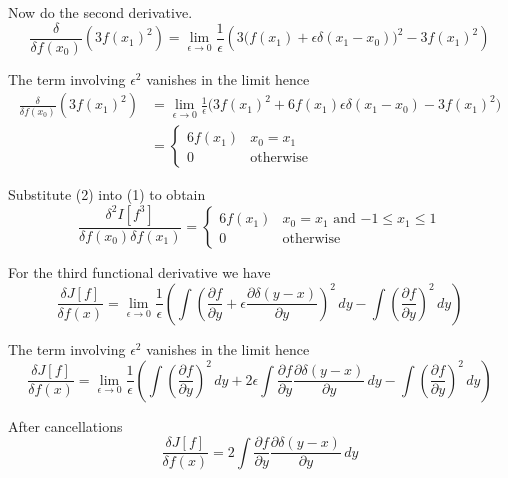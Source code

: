 Now do the second derivative.
\begin{equation*}
\frac{\delta}{\delta f(x_0)}\left(3f(x_1)^2\right)
=\lim_{\epsilon\rightarrow0}\frac{1}{\epsilon}
\left(
3\big(f(x_1)+\epsilon\delta(x_1-x_0)\big)^2-3f(x_1)^2
\right)
\end{equation*}

The term involving $\epsilon^2$ vanishes in the limit hence
\begin{align*}
\frac{\delta}{\delta f(x_0)}\left(3f(x_1)^2\right)
&=\lim_{\epsilon\rightarrow0}\frac{1}{\epsilon}
\big(
3f(x_1)^2+6f(x_1)\epsilon\delta(x_1-x_0)-3f(x_1)^2
\big)
\\
&=\begin{cases}
6f(x_1) & x_0=x_1
\\
0 & \text{otherwise}
\end{cases}
\tag{2}
\end{align*}

Substitute (2) into (1) to obtain
\begin{equation*}
\frac{\delta^2 I[f^3]}{\delta f(x_0)\delta f(x_1)}
=\begin{cases}
6f(x_1) & \text{$x_0=x_1$ and $-1\le x_1\le1$}
\\
0 & \text{otherwise}
\end{cases}
\end{equation*}

For the third functional derivative we have
\begin{equation*}
\frac{\delta J[f]}{\delta f(x)}
=\lim_{\epsilon\rightarrow0}\frac{1}{\epsilon}
\left(\int\left(
\frac{\partial f}{\partial y}+\epsilon\frac{\partial\delta(y-x)}{\partial y}
\right)^2\,dy
-\int\left(\frac{\partial f}{\partial y}\right)^2\,dy
\right)
\end{equation*}

The term involving $\epsilon^2$ vanishes in the limit hence
\begin{equation*}
\frac{\delta J[f]}{\delta f(x)}={}
\lim_{\epsilon\rightarrow0}\frac{1}{\epsilon}
\left(
\int\left(\frac{\partial f}{\partial y}\right)^2\,dy
+2\epsilon\int\frac{\partial f}{\partial y}\frac{\partial\delta(y-x)}{\partial y}\,dy
-\int\left(\frac{\partial f}{\partial y}\right)^2\,dy
\right)
\end{equation*}

After cancellations
\begin{equation*}
\frac{\delta J[f]}{\delta f(x)}=2\int\frac{\partial f}{\partial y}\frac{\partial\delta(y-x)}{\partial y}\,dy
\end{equation*}

